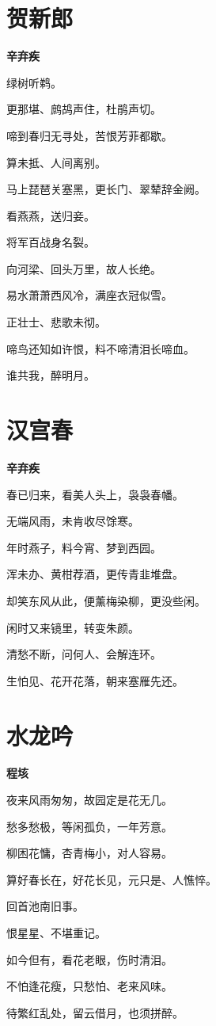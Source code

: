 \documentclass[12pt,a4paper]{ctexbook}
\begin{document}
\section{贺新郎}
\textbf{辛弃疾}\par\vspace{0.5em}
绿树听鹈。\par
更那堪、鹧鸪声住，杜鹃声切。\par
啼到春归无寻处，苦恨芳菲都歇。\par
算未抵、人间离别。\par
马上琵琶关塞黑，更长门、翠辇辞金阙。\par
看燕燕，送归妾。\par
将军百战身名裂。\par
向河梁、回头万里，故人长绝。\par
易水萧萧西风冷，满座衣冠似雪。\par
正壮士、悲歌未彻。\par
啼鸟还知如许恨，料不啼清泪长啼血。\par
谁共我，醉明月。\par

\section{汉宫春}
\textbf{辛弃疾}\par\vspace{0.5em}
春已归来，看美人头上，袅袅春幡。\par
无端风雨，未肯收尽馀寒。\par
年时燕子，料今宵、梦到西园。\par
浑未办、黄柑荐酒，更传青韭堆盘。\par
却笑东风从此，便薰梅染柳，更没些闲。\par
闲时又来镜里，转变朱颜。\par
清愁不断，问何人、会解连环。\par
生怕见、花开花落，朝来塞雁先还。\par

\section{水龙吟}
\textbf{程垓}\par\vspace{0.5em}
夜来风雨匆匆，故园定是花无几。\par
愁多愁极，等闲孤负，一年芳意。\par
柳困花慵，杏青梅小，对人容易。\par
算好春长在，好花长见，元只是、人憔悴。\par
回首池南旧事。\par
恨星星、不堪重记。\par
如今但有，看花老眼，伤时清泪。\par
不怕逢花瘦，只愁怕、老来风味。\par
待繁红乱处，留云借月，也须拼醉。\par
\end{document}

